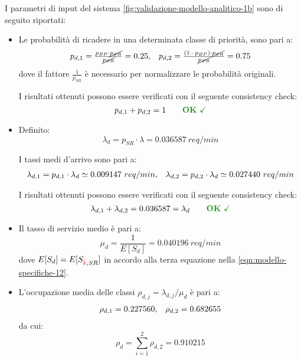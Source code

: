 I parametri di input del sistema \ref{fig:validazione-modello-analitico-1b} sono di seguito riportati:
\begin{itemize}
\item Le probabilità di ricadere in una determinata classe di priorità, sono pari a:
\begin{equation}
\begin{array}{l l}
p_{d,1} = \frac{p_{BP} \cdot \cancel{p_{SR}}}{\cancel{p_{SR}}} = 0.25, & p_{d,2} = \frac{(1-p_{BP}) \cdot \cancel{p_{SR}}}{\cancel{p_{SR}}} = 0.75
\end{array}
\end{equation}
dove il fattore $\frac{1}{p_{SR}}$ è necessario per normalizzare le probabilità originali.

I risultati ottenuti possono essere verificati con il seguente consistency check:
\begin{equation}
p_{d,1} + p_{d,2}  = 1 \qquad \text{\color{forestgreen}\textbf{OK} \checkmark}
\end{equation}
\item Definito:
\begin{equation}
\lambda_d = p_{SR}\cdot \lambda = 0.036587\ req/min
\end{equation} 

I tassi medi d'arrivo sono pari a:
\begin{equation}
\begin{array}{l l}
\lambda_{d,1} = p_{d,1} \cdot \lambda_d \simeq 0.009147\ req/min, & \lambda_{d,2} = p_{d,2} \cdot \lambda_d \simeq 0.027440\ req/min
\end{array}
\end{equation}

I risultati ottenuti possono essere verificati con il seguente consistency check:
\begin{equation}
\lambda_{d,1} + \lambda_{d,2} = 0.036587 = \lambda_d \qquad \text{\color{forestgreen}\textbf{OK} \checkmark}
\end{equation}

\item Il tasso di servizio medio è pari a:
\begin{equation}
\mu_d = \frac{1}{E[S_d]} = 0.040196\ req/min
\end{equation}
dove $E[S_d] = E[S_{{\color{red}\hat{k}}{}, SR}]$ in accordo alla terza equazione nella \ref{eqn:modello-specifiche-12}.

\item L'occupazione media delle classi $\rho_{d,j} = \lambda_{d,j}/\mu_d$ è pari a:
\begin{equation}
\begin{array}{l l}
\rho_{d,1} = 0.227560, & \rho_{d,2} = 0.682655
\end{array}
\end{equation}
da cui:
\begin{equation}
\label{eqn:validazione-11}
\rho_d = \sum_{i=1}^2 \rho_{d,2} = 0.910215
\end{equation}
\end{itemize}


